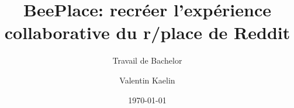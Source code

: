 \author{Valentin Kaelin}


\title{BeePlace: recréer l'expérience collaborative du r/place de Reddit}

\subtitle{Travail de Bachelor}


\date{\today}


